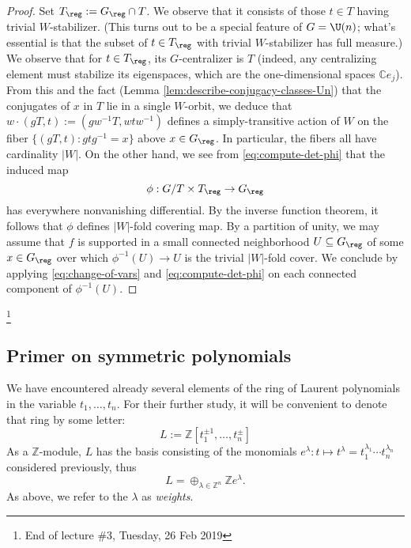 \documentclass[reqno]{amsart} 
\begin{document}
\begin{proof}
  Set $T_{\reg} := G_{\reg} \cap T$.  We observe that it consists of those $t \in T$ having trivial $W$-stabilizer.  (This turns out to be a special feature of $G = \U(n)$; what's essential is that the subset of $t \in T_{\reg}$ with trivial $W$-stabilizer has full measure.)  We observe that for $t \in T_{\reg}$, its $G$-centralizer is $T$ (indeed, any centralizing element must stabilize its eigenspaces, which are the one-dimensional spaces $\mathbb{C} e_j$).  From this and the fact (Lemma \ref{lem:describe-conjugacy-classes-Un}) that the conjugates of $x$ in $T$ lie in a single $W$-orbit, we deduce that $w \cdot (g T, t) := (g w^{-1} T, w t w^{-1})$ defines a simply-transitive action of $W$ on the fiber $\{(g T, t) : g t g^{-1} = x\}$ above $x \in G_{\reg}$.  In particular, the fibers all have cardinality $|W|$.  On the other hand, we see from \eqref{eq:compute-det-phi} that the induced map
  \begin{equation}\label{eq:}
    \phi : G/T \times T_{\reg} \rightarrow G_{\reg}
  \end{equation}
  has everywhere nonvanishing differential.  By the inverse function theorem, it follows that $\phi$ defines $|W|$-fold covering map.  By a partition of unity, we may assume that $f$ is supported in a small connected neighborhood $U \subseteq G_{\reg}$ of some $x \in G_{\reg}$ over which $\phi^{-1}(U) \rightarrow U$ is the trivial $|W|$-fold cover.  We conclude by applying \eqref{eq:change-of-vars} and \eqref{eq:compute-det-phi} on each connected component of $\phi^{-1}(U)$.
\end{proof}
\footnote{End of lecture \#3, Tuesday, 26 Feb 2019}

\subsection{Primer on symmetric polynomials}
We have encountered already several elements of the ring of Laurent polynomials in the variable $t_1,\dotsc,t_n$.  For their further study, it will be convenient to denote that ring by some letter:
\begin{equation*}
  L := \mathbb{Z}[t_1^{\pm 1},\dotsc,t_n^{\pm}]
\end{equation*}
As a $\mathbb{Z}$-module, $L$ has the basis consisting of the monomials $e^\lambda : t \mapsto t^{\lambda} = t_1^{\lambda_1} \dotsb t_n^{\lambda_n}$ considered previously, thus
\begin{equation*}
  L = \oplus_{\lambda \in \mathbb{Z}^n} \mathbb{Z} e^\lambda.
\end{equation*}
As above, we refer to the $\lambda$ as \emph{weights}.
\end{document}
